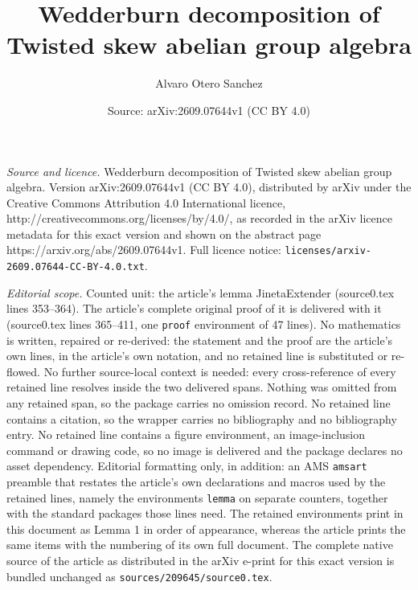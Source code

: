 \documentclass[10pt,a4paper]{amsart}
\title{Wedderburn decomposition of Twisted skew abelian group algebra}
\author{Alvaro Otero Sanchez}
\date{Source: arXiv:2609.07644v1 (CC BY 4.0)}
\begin{document}
\maketitle

\noindent\emph{Source and licence.} Wedderburn decomposition of Twisted skew abelian group algebra. Version arXiv:2609.07644v1 (CC BY 4.0), distributed by arXiv under the Creative Commons Attribution 4.0 International licence, http://creativecommons.org/licenses/by/4.0/, as recorded in the arXiv licence metadata for this exact version and shown on the abstract page https://arxiv.org/abs/2609.07644v1. Full licence notice: \texttt{licenses/arxiv-2609.07644-CC-BY-4.0.txt}.\par\smallskip

\noindent\textit{Editorial scope.} Counted unit: the article's lemma JinetaExtender (source0.tex lines 353--364). The article's complete original proof of it is delivered with it (source0.tex lines 365--411, one \texttt{proof} environment of 47 lines). No mathematics is written, repaired or re-derived: the statement and the proof are the article's own lines, in the article's own notation, and no retained line is substituted or re-flowed.  No further source-local context is needed: every cross-reference of every retained line resolves inside the two delivered spans.  Nothing was omitted from any retained span, so the package carries no omission record.  No retained line contains a citation, so the wrapper carries no bibliography and no bibliography entry.  No retained line contains a figure environment, an image-inclusion command or drawing code, so no image is delivered and the package declares no asset dependency.  Editorial formatting only, in addition: an AMS \texttt{amsart} preamble that restates the article's own declarations and macros used by the retained lines, namely the environments \texttt{lemma} on separate counters, together with the standard packages those lines need.  The retained environments print in this document as Lemma 1 in order of appearance, whereas the article prints the same items with the numbering of its own full document.  The complete native source of the article as distributed in the arXiv e-print for this exact version is bundled unchanged as \texttt{sources/209645/source0.tex}.
\end{document}
